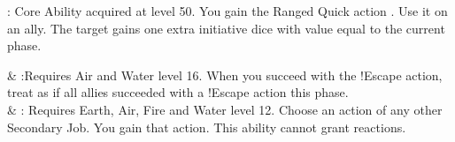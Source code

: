 \begin{ffminipage}
\noindent{}: Core Ability acquired at level 50. You gain the Ranged Quick action . Use it on an ally. The target gains one extra initiative dice with value equal to the current phase. 

\begin{jobspec}
  & %
:Requires Air and Water level 16. When you succeed with the !Escape action, treat as if all allies succeeded with a !Escape action this phase. \\
    & %
: Requires Earth, Air, Fire and Water level 12. Choose an action of any other Secondary Job.  You gain that action. This ability cannot grant reactions. \\
\end{jobspec}
\end{ffminipage}